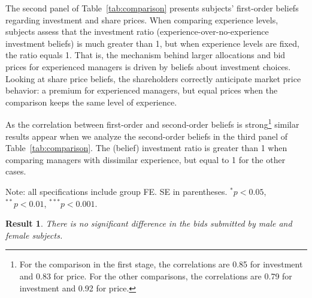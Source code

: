 \documentclass[12pt, letterpaper]{article}
\newtheorem{result}{Result}
\begin{document}
The second panel of Table~\ref{tab:comparison} presents subjects' first-order beliefs regarding investment and share prices. When comparing experience levels, subjects assess that the investment ratio (experience-over-no-experience investment beliefs) is much greater than 1, but when experience levels are fixed, the ratio equals 1. That is, the mechanism behind larger allocations and bid prices for experienced managers is driven by beliefs about investment choices. Looking at share price beliefs, the shareholders correctly anticipate market price behavior: a premium for experienced managers, but equal prices when the comparison keeps the same level of experience. 

As the correlation between first-order and second-order beliefs is strong\footnote{For the comparison in the first stage, the correlations are 0.85 for investment and 0.83 for price. For the other comparisons, the correlations are 0.79 for investment and 0.92 for price.} similar results appear when we analyze the second-order beliefs in the third panel of Table~\ref{tab:comparison}. The (belief) investment ratio is greater than 1 when comparing managers with dissimilar experience, but equal to 1 for the other cases. 



\begin{table}[!htbp]
  \centering
  \caption{Bid (log difference, OLS)}
  \label{tab:bid_reg}
  \footnotesize
  \begin{center}
    
  \end{center}
    \begin{tablenotes}
  \footnotesize
  \item Note: all specifications include group FE. SE in parentheses. $^{*}p<0.05$, $^{**}p<0.01$, $^{***}p<0.001$.
  \end{tablenotes}
\end{table}


\begin{result} 
\label{r7}
There is no significant difference in the bids submitted by male and female subjects.
\end{result}
\end{document}
